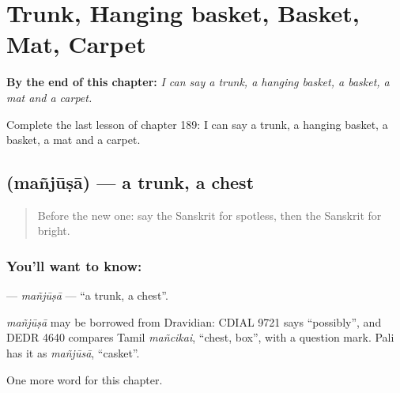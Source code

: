 
\chapter{Trunk, Hanging basket, Basket, Mat, Carpet}
\label{ch:sa-trunk-hanging-basket-basket-mat-carpet}

\begin{chapteropening}
\textbf{By the end of this chapter:} \emph{I can say a trunk, a hanging basket, a basket, a mat and a carpet.}

Complete the last lesson of chapter 189: I can say a trunk, a hanging basket, a basket, a mat and a carpet.
\end{chapteropening}

\section[\texorpdfstring{\sk{मञ्जूषा} (mañjūṣā)}{मञ्जूषा (mañjūṣā)}]{ (mañjūṣā) — a trunk, a chest}

\label{lesson:SA-C189-manjusa}



\begin{quote}
Before the new one: say the Sanskrit for spotless, then the Sanskrit for bright.
\end{quote}

\subsection*{You'll want to know: }
\textbf{} — \emph{mañjūṣā} — \textquotedblleft{}a trunk, a chest\textquotedblright{}.

\begin{cousinweb}
\emph{mañjūṣā} may be borrowed from Dravidian: CDIAL 9721 says \textquotedblleft{}possibly\textquotedblright{}, and DEDR 4640 compares Tamil \emph{mañcikai}, \textquotedblleft{}chest, box\textquotedblright{}, with a question mark. Pali has it as \emph{mañjūsā}, \textquotedblleft{}casket\textquotedblright{}.
\end{cousinweb}

\begin{grammarlens}[title={What you've built}]
One more word for this chapter.
\end{grammarlens}

